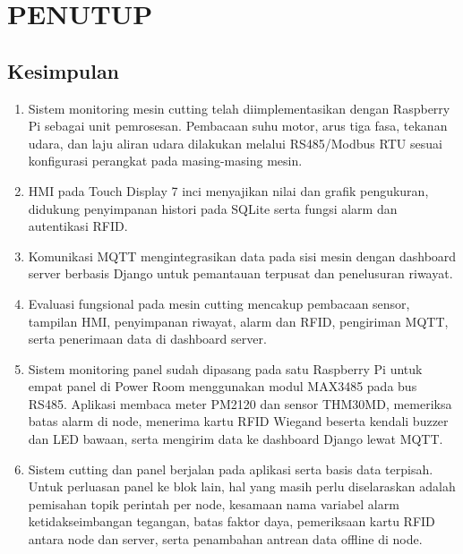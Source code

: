 \begingroup
\titlespacing*{\section}{0pt}{8pt}{2pt}
\titlespacing*{\subsection}{0pt}{6pt}{2pt}
\titlespacing*{\subsubsection}{0pt}{2pt}{1pt}
\chapter{PENUTUP}
\section{Kesimpulan}

\begin{enumerate}[leftmargin=*,itemsep=2pt]
\item Sistem monitoring mesin cutting telah diimplementasikan dengan Raspberry Pi sebagai unit pemrosesan. Pembacaan suhu motor, arus tiga fasa, tekanan udara, dan laju aliran udara dilakukan melalui RS485/Modbus RTU sesuai konfigurasi perangkat pada masing-masing mesin.

\item HMI pada Touch Display 7 inci menyajikan nilai dan grafik pengukuran, didukung penyimpanan histori pada SQLite serta fungsi alarm dan autentikasi RFID.

\item Komunikasi MQTT mengintegrasikan data pada sisi mesin dengan dashboard server berbasis Django untuk pemantauan terpusat dan penelusuran riwayat.

\item Evaluasi fungsional pada mesin cutting mencakup pembacaan sensor, tampilan HMI, penyimpanan riwayat, alarm dan RFID, pengiriman MQTT, serta penerimaan data di dashboard server.

\item Sistem monitoring panel sudah dipasang pada satu Raspberry Pi untuk empat panel di Power Room menggunakan modul MAX3485 pada bus RS485. Aplikasi membaca meter PM2120 dan sensor THM30MD, memeriksa batas alarm di node, menerima kartu RFID Wiegand beserta kendali buzzer dan LED bawaan, serta mengirim data ke dashboard Django lewat MQTT.

\item Sistem cutting dan panel berjalan pada aplikasi serta basis data terpisah. Untuk perluasan panel ke blok lain, hal yang masih perlu diselaraskan adalah pemisahan topik perintah per node, kesamaan nama variabel alarm ketidakseimbangan tegangan, batas faktor daya, pemeriksaan kartu RFID antara node dan server, serta penambahan antrean data offline di node.

\end{enumerate}

